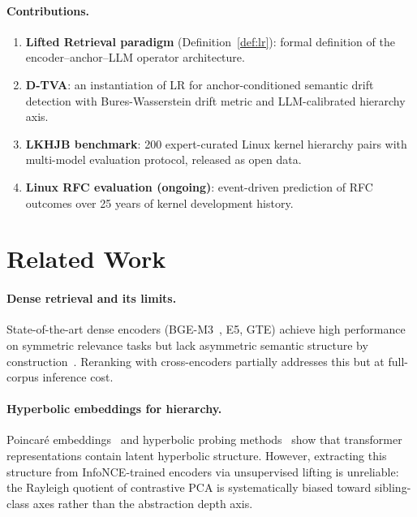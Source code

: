 \documentclass[twocolumn]{article}
\newcommand{\lr}{\textsc{LR}}
\begin{document}
\paragraph{Contributions.}
\begin{enumerate}[leftmargin=*,itemsep=1pt]
\item \textbf{Lifted Retrieval paradigm} (Definition~\ref{def:lr}):
  formal definition of the encoder--anchor--LLM operator architecture.
\item \textbf{D-TVA}: an instantiation of \lr{} for anchor-conditioned
  semantic drift detection with Bures-Wasserstein drift metric and
  LLM-calibrated hierarchy axis.
\item \textbf{LKHJB benchmark}: 200 expert-curated Linux kernel
  hierarchy pairs with multi-model evaluation protocol, released
  as open data.
\item \textbf{Linux RFC evaluation (ongoing)}: event-driven prediction
  of RFC outcomes over 25 years of kernel development history.
\end{enumerate}

\section{Related Work}
\label{sec:related}

\paragraph{Dense retrieval and its limits.}
State-of-the-art dense encoders (BGE-M3~\cite{bge-m3}, E5, GTE) achieve
high performance on symmetric relevance tasks but lack asymmetric
semantic structure by construction~\cite{wang2020understanding}.
Reranking with cross-encoders partially addresses this but at full-corpus
inference cost.

\paragraph{Hyperbolic embeddings for hierarchy.}
Poincar\'e embeddings~\cite{nickel2017poincare} and hyperbolic probing
methods~\cite{chen2021probing} show that transformer representations
contain latent hyperbolic structure.
However, extracting this structure from InfoNCE-trained encoders via
unsupervised lifting is unreliable: the Rayleigh quotient of contrastive
PCA is systematically biased toward sibling-class axes rather than the
abstraction depth axis.
\end{document}
